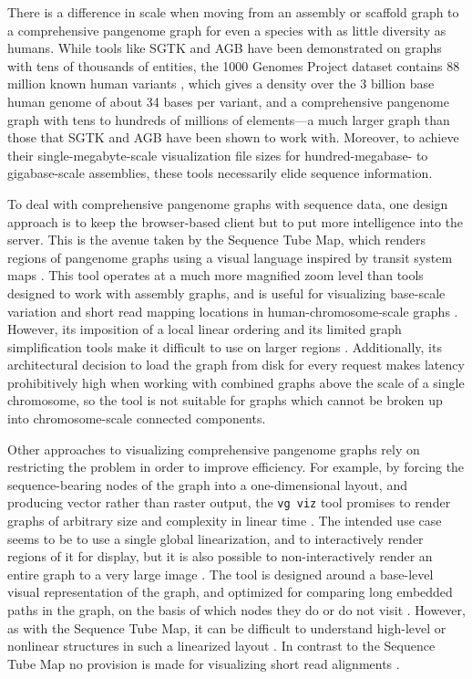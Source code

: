 There is a difference in scale when moving from an assembly or scaffold graph to a comprehensive pangenome graph for even a species with as little diversity as humans.
While tools like SGTK and AGB have been demonstrated on graphs with tens of thousands of entities, the 1000 Genomes Project dataset contains 88 million known human variants \citep{1000_2015}, which gives a density over the 3 billion base human genome of about 34 bases per variant, and a comprehensive pangenome graph with tens to hundreds of millions of elements---a much larger graph than those that SGTK and AGB have been shown to work with.
Moreover, to achieve their single-megabyte-scale visualization file sizes for hundred-megabase- to gigabase-scale assemblies, these tools necessarily elide sequence information.

To deal with comprehensive pangenome graphs with sequence data, one design approach is to keep the browser-based client but to put more intelligence into the server.
This is the avenue taken by the Sequence Tube Map, which renders regions of pangenome graphs using a visual language inspired by transit system maps \citep{Beyer_2019}.
This tool operates at a much more magnified zoom level than tools designed to work with assembly graphs, and is useful for visualizing base-scale variation and short read mapping locations in human-chromosome-scale graphs \citep{Beyer_2019}.
However, its imposition of a local linear ordering and its limited graph simplification tools make it difficult to use on larger regions \citep{Beyer_2019}.
Additionally, its architectural decision to load the graph from disk for every request makes latency prohibitively high when working with combined graphs above the scale of a single chromosome, so the tool is not suitable for graphs which cannot be broken up into chromosome-scale connected components.

Other approaches to visualizing comprehensive pangenome graphs rely on restricting the problem in order to improve efficiency.
For example, by forcing the sequence-bearing nodes of the graph into a one-dimensional layout, and producing vector rather than raster output, the \texttt{vg viz} tool promises to render graphs of arbitrary size and complexity in linear time \citep{Garrison_2019}. 
The intended use case seems to be to use a single global linearization, and to interactively render regions of it for display, but it is also possible to non-interactively render an entire graph to a very large image \citep{Garrison_2019}. 
The tool is designed around a base-level visual representation of the graph, and optimized for comparing long embedded paths in the graph, on the basis of which nodes they do or do not visit \citep{Garrison_2019}. 
However, as with the Sequence Tube Map, it can be difficult to understand high-level or nonlinear structures in such a linearized layout \citep{Garrison_2019}. 
In contrast to the Sequence Tube Map no provision is made for visualizing short read alignments \citep{Garrison_2019}.

